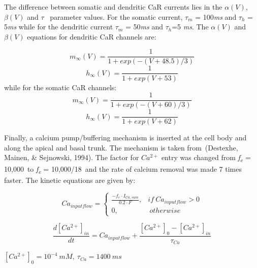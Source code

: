 \documentclass[a4paper,12pt]{article}
\begin{document}
The difference between somatic and dendritic CaR currents lies in the $\alpha(V)$, $\beta(V)$ and $\tau$ ~parameter
values. For the somatic current, $\tau_m$ = 100\textit{ms} and
$\tau_h$ = 5\textit{ms} while for the dendritic current $\tau_m$ = 50\textit{ms} and $\tau_h$=5 \textit{ ms}. The $\alpha(V)$ and $\beta(V)$ equations for dendritic CaR channels are:


\begin{equation}
m_{\infty}(V)=\frac {1}{1+exp(-(V+48.5)/3)}
\end{equation}
\begin{equation}
h_{\infty}(V)=\frac {1}{1+exp(V+53)}
\end{equation}
while for the somatic CaR channels:
\begin{equation}
m_{\infty}(V)=\frac {1}{1+exp(-(V+60)/3)}
\end{equation}
\begin{equation}
h_{\infty}(V)=\frac {1}{1+exp(V+62)}
\end{equation}

Finally, a calcium pump/buffering mechanism is inserted at the cell body and along the apical and basal trunk. The
mechanism is taken from~(Destexhe, Mainen, \& Sejnowski, 1994). The factor for
$Ca^{2+}$ entry was changed from
\textit{f\textsubscript{e}} = 10,000~to \textit{f\textsubscript{e}} = 10,000/18~and the rate of calcium removal was made 7 times faster. The kinetic equations are given by:

\begin{equation}
Ca_{input flow} = \begin{cases} \frac{-f_e \cdot I_{Ca, sum} }{0.2 \cdot F}, & if \ Ca_{input flow} > 0  \\ 0, & \  otherwise \ \end{cases}
\end{equation}

\begin{equation}
\frac{d[Ca^{2+}]_{in}}{dt}=Ca_{input flow} +\frac{[Ca^{2+}]_{0}-[Ca^{2+}]_{in}}{\tau_{Ca}}
\end{equation}

$[Ca^{2+}]_{0} = 10^{-4} \ mM, \ \tau_{Ca} = 1400 \ ms$


\bigskip
\end{document}
